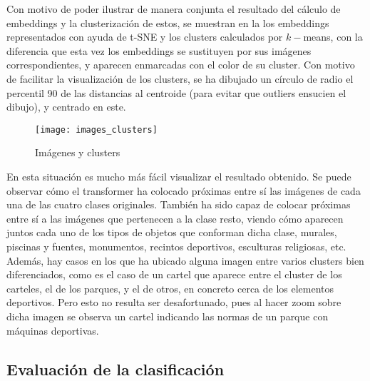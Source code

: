 				Con motivo de poder ilustrar de manera conjunta el resultado del cálculo de embeddings y la clusterización de estos, se muestran en la  los embeddings representados con ayuda de t-SNE y los clusters calculados por $k-$means, con la diferencia que esta vez los embeddings se sustituyen por sus imágenes correspondientes, y aparecen enmarcadas con el color de su cluster. Con motivo de facilitar la visualización de los clusters, se ha dibujado un círculo de radio el percentil 90 de las distancias al centroide (para evitar que outliers ensucien el dibujo), y centrado en este. \\
				
				\begin{figure}[!h]
					\centering
					\texttt{[image: images\_clusters]}
					\caption{Imágenes y clusters}
					\label{fig:embeddings_visuales}
				\end{figure} 
				
				En esta situación es mucho más fácil visualizar el resultado obtenido. Se puede observar cómo el transformer ha colocado próximas entre sí las imágenes de cada una de las cuatro clases originales. También ha sido capaz de colocar próximas entre sí a las imágenes que pertenecen a la clase resto, viendo cómo aparecen juntos cada uno de los tipos de objetos que conforman dicha clase, murales, piscinas y fuentes, monumentos, recintos deportivos, esculturas religiosas, etc. Además, hay casos en los que ha ubicado alguna imagen entre varios clusters bien diferenciados, como es el caso de un cartel que aparece entre el cluster de los carteles, el de los parques, y el de otros, en concreto cerca de los elementos deportivos. Pero esto no resulta ser desafortunado, pues al hacer zoom sobre dicha imagen se observa un cartel indicando las normas de un parque con máquinas deportivas. 
				
			\subsection{Evaluación de la clasificación}
			
				
				